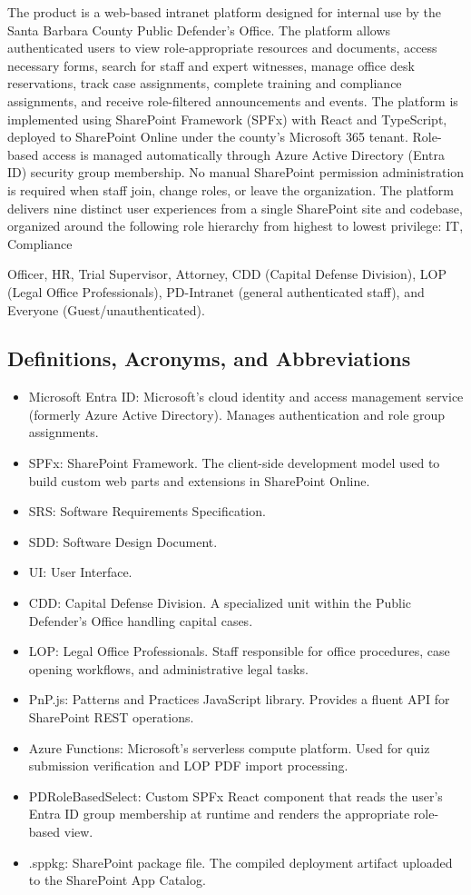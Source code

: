 \documentclass[12pt]{article}
\begin{document}
The product is a web-based intranet platform designed for internal use by the Santa Barbara County Public Defender's Office. The platform allows authenticated users to view role-appropriate resources and documents, access necessary forms, search for staff and expert witnesses, manage office desk reservations, track case assignments, complete training and compliance assignments, and receive role-filtered announcements and events. The platform is implemented using SharePoint Framework (SPFx) with React and TypeScript, deployed to SharePoint Online under the county's Microsoft 365 tenant. Role-based access is managed automatically through Azure Active Directory (Entra ID) security group membership. No manual SharePoint permission administration is required when staff join, change roles, or leave the organization. The platform delivers nine distinct user experiences from a single SharePoint site and codebase, organized around the following role hierarchy from highest to lowest privilege: IT, Compliance

Officer, HR, Trial Supervisor, Attorney, CDD (Capital Defense Division), LOP (Legal Office Professionals), PD-Intranet (general authenticated staff), and Everyone (Guest/unauthenticated).

\subsection{Definitions, Acronyms, and Abbreviations}

\begin{itemize}[leftmargin=*]
\item  Microsoft Entra ID: Microsoft's cloud identity and access management service (formerly Azure Active Directory). Manages authentication and role group assignments.
\item  SPFx: SharePoint Framework. The client-side development model used to build custom web parts and extensions in SharePoint Online.
\item  SRS: Software Requirements Specification.
\item  SDD: Software Design Document.
\item  UI: User Interface.
\item  CDD: Capital Defense Division. A specialized unit within the Public Defender's Office handling capital cases.
\item  LOP: Legal Office Professionals. Staff responsible for office procedures, case opening workflows, and administrative legal tasks.
\item  PnP.js: Patterns and Practices JavaScript library. Provides a fluent API for SharePoint REST operations.
\item  Azure Functions: Microsoft's serverless compute platform. Used for quiz submission verification and LOP PDF import processing.
\item  PDRoleBasedSelect: Custom SPFx React component that reads the user's Entra ID group membership at runtime and renders the appropriate role-based view.
\item  .sppkg: SharePoint package file. The compiled deployment artifact uploaded to the SharePoint App Catalog.
\end{itemize}
\end{document}
